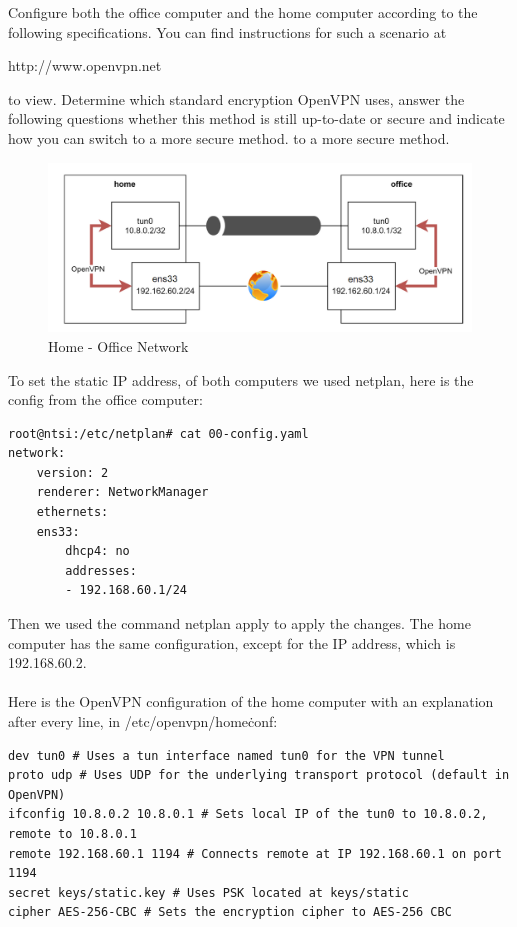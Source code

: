 Configure both the office computer and the home computer according to the following specifications. You can find instructions for such a scenario at

http://www.openvpn.net

to view. Determine which standard encryption OpenVPN uses, answer the following questions
whether this method is still up-to-date or secure and indicate how you can switch to a more secure method.
to a more secure method.

\begin{figure}[H]
	\centering
	\includegraphics[width=0.8\linewidth]{Figures/home-office.png}
	\caption{Home - Office Network}
\end{figure}

To set the static IP address, of both computers we used netplan, here is the config from the office computer:

\begin{verbatim}
root@ntsi:/etc/netplan# cat 00-config.yaml 
network:
    version: 2
    renderer: NetworkManager
    ethernets:
    ens33:
        dhcp4: no
        addresses:
        - 192.168.60.1/24
\end{verbatim}

Then we used the command netplan apply to apply the changes. The home computer has the same configuration, except for the IP address, which is 192.168.60.2.
\\\\
Here is the OpenVPN configuration of the home computer with an explanation after every line, in /etc/openvpn/home\.conf:

\begin{verbatim}
dev tun0 # Uses a tun interface named tun0 for the VPN tunnel
proto udp # Uses UDP for the underlying transport protocol (default in OpenVPN)
ifconfig 10.8.0.2 10.8.0.1 # Sets local IP of the tun0 to 10.8.0.2, remote to 10.8.0.1
remote 192.168.60.1 1194 # Connects remote at IP 192.168.60.1 on port 1194
secret keys/static.key # Uses PSK located at keys/static
cipher AES-256-CBC # Sets the encryption cipher to AES-256 CBC
\end{verbatim}

